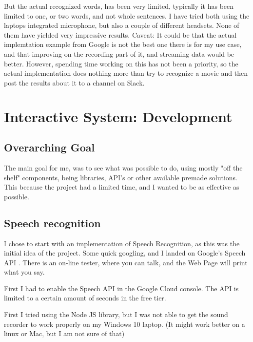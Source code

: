\documentclass[11pt,fleqn]{book} %
\begin{document}
But the actual recognized words, has been very limited, typically it has been limited to one, or two words, and not whole sentences.
I have tried both using the laptops integrated microphone, but also a couple of different headsets. None of them have yielded very impressive results.
Caveat: It could be that the actual implemtation example from Google is not the best one there is for my use case, and that improving on the recording part of it, and streaming data would be better. However, spending time working on this has not been a priority, so the actual implementation does nothing more than try to recognize a movie and then post the results about it to a channel on Slack.





\chapter{Interactive System: Development}
\section{Overarching Goal}
The main goal for me, was to see what was possible to do, using mostly "off the shelf" components, being libraries, API's or other available premade solutions. This because the project had a limited time, and I wanted to be as effective as possible.
\section{Speech recognition}
I chose to start with an implementation of Speech Recognition, as this was the initial idea of the project.
Some quick googling, and I landed on Google's Speech API \cite{GoogleCloudPlatformSpeechPlatform}. There is an on-line tester, where you can talk, and the Web Page will print what you say.

First I had to enable the Speech API in the Google Cloud console. The API is limited to a certain amount of seconds in the free tier.

First I tried using the Node JS library, but I was not able to get the sound recorder to work properly on my Windows 10 laptop. (It might work better on a linux or Mac, but I am not sure of that)
\end{document}

